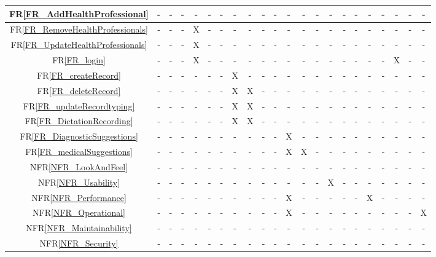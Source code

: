 \documentclass[12pt]{article}
\begin{document}
\begin{itemize}
\begin{landscape}
\begin{table}[H]
\begin{tabular}{|c|c|c|c|c|c|c|c|c|c|c|c|c|c|c|c|c|c|c|c|c|c|}
      FR\ref{FR_AddHealthProfessional} & - & - & - & - & - & - & - & - & - & - & - & - & - & - & - & - & - & - & - & - & -  \\ \hline
      FR\ref{FR_RemoveHealthProfessionals} & - & - & - & X & - & - & - & - & - & - & - & - & - & - & - & - & - & - & - & - & -  \\ \hline
      FR\ref{FR_UpdateHealthProfessionals} & - & - & - & X & - & - & - & - & - & - & - & - & - & - & - & - & - & - & - & - & - \\ \hline
      FR\ref{FR_login} & - & - & - & X & - & - & - & - & - & - & - & - & - & - & - & - & - & - & X & - & - \\ \hline
      FR\ref{FR_createRecord} & - & - & - & - & - & - & X & - & - & - & - & - & - & - & - & - & - & - & - & - & - \\ \hline
      FR\ref{FR_deleteRecord} & - & - & - & - & - & - & X & X & - & - & - & - & - & - & - & - & - & - & - & - & - \\ \hline
      FR\ref{FR_updateRecordtyping} & - & - & - & - & - & - & X & X &  - & - & - & - & - & - & - & - & - & - & - & - & - \\ \hline
      FR\ref{FR_DictationRecording} & - & - & - & - & - & - & X & X & - & - & - & - & - & - & - & - & - & - & - & - & - \\ \hline
      FR\ref{FR_DiagnosticSuggestions} & - & - & - & - & - & - & - & - & - & - & X & - & - & - & - & - & - & - & - & - & - \\ \hline
      FR\ref{FR_medicalSuggestions} & - & - & - & - & - & - & - & - & - & - & X & X & - & - & - & - & - & - & - & - & - \\ \hline
      NFR\ref{NFR_LookAndFeel} & - & - & - & - & - & - & - & - & - & - & - & - & -  & - & - & - & - & - & - & - & - \\ \hline
      NFR\ref{NFR_Usability} & - & - & - & - & - & - & - & - & - & - & - & - & - & X & - & - & - & - & - & - & - \\ \hline
      NFR\ref{NFR_Performance} & - & - & - & - & - & - & - & - & - & - & X & - & - & - & - & - & X & - & - & - & - \\ \hline
      NFR\ref{NFR_Operational} & - & - & - & - & - & - & - & - & - & - & X & -  & - & - & - & - & - & - & - & - & X \\ \hline
      NFR\ref{NFR_Maintainability} & - & - & - & - & - & - & - & - & - & - & - & - & - & - & - & - & - & - & - & - & - \\ \hline
      NFR\ref{NFR_Security} & - & - & - & - & - & - & - & - & - & - & - & - & - & - & - & - & - & - & - & - & - \\ \hline

\end{tabular}
\end{table}
\end{landscape}
\end{itemize}
\end{document}
